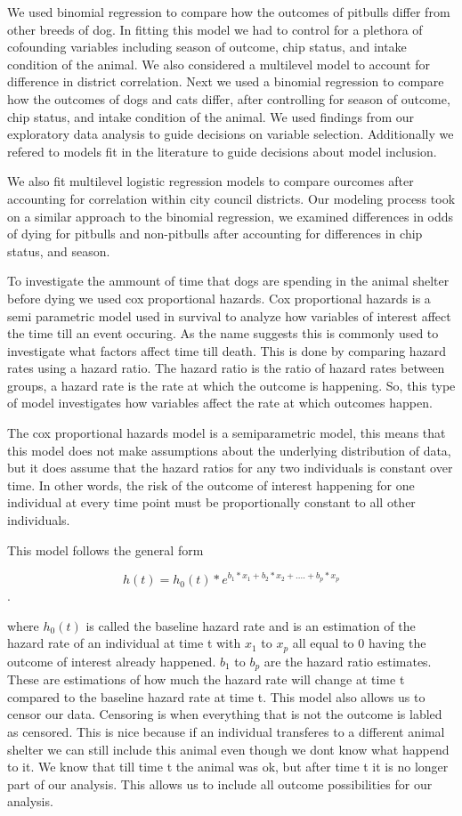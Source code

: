 \documentclass[]{article}
\begin{document}
We used binomial regression to compare how the outcomes of pitbulls
differ from other breeds of dog. In fitting this model we had to control
for a plethora of cofounding variables including season of outcome, chip
status, and intake condition of the animal. We also considered a
multilevel model to account for difference in district correlation. Next
we used a binomial regression to compare how the outcomes of dogs and
cats differ, after controlling for season of outcome, chip status, and
intake condition of the animal. We used findings from our exploratory
data analysis to guide decisions on variable selection. Additionally we
refered to models fit in the literature to guide decisions about model
inclusion.

We also fit multilevel logistic regression models to compare ourcomes
after accounting for correlation within city council districts. Our
modeling process took on a similar approach to the binomial regression,
we examined differences in odds of dying for pitbulls and non-pitbulls
after accounting for differences in chip status, and season.

To investigate the ammount of time that dogs are spending in the animal
shelter before dying we used cox proportional hazards. Cox proportional
hazards is a semi parametric model used in survival to analyze how
variables of interest affect the time till an event occuring. As the
name suggests this is commonly used to investigate what factors affect
time till death. This is done by comparing hazard rates using a hazard
ratio. The hazard ratio is the ratio of hazard rates between groups, a
hazard rate is the rate at which the outcome is happening. So, this type
of model investigates how variables affect the rate at which outcomes
happen.

The cox proportional hazards model is a semiparametric model, this means
that this model does not make assumptions about the underlying
distribution of data, but it does assume that the hazard ratios for any
two individuals is constant over time. In other words, the risk of the
outcome of interest happening for one individual at every time point
must be proportionally constant to all other individuals.

This model follows the general form

\[h(t)=h_0(t)*e^{b_1*x_1+b_2*x_2+....+b_p*x_p}\].

where \(h_0(t)\) is called the baseline hazard rate and is an estimation
of the hazard rate of an individual at time t with \(x_1\) to \(x_p\)
all equal to 0 having the outcome of interest already happened. \(b_1\)
to \(b_p\) are the hazard ratio estimates. These are estimations of how
much the hazard rate will change at time t compared to the baseline
hazard rate at time t. This model also allows us to censor our data.
Censoring is when everything that is not the outcome is labled as
censored. This is nice because if an individual transferes to a
different animal shelter we can still include this animal even though we
dont know what happend to it. We know that till time t the animal was
ok, but after time t it is no longer part of our analysis. This allows
us to include all outcome possibilities for our analysis.
\end{document}
